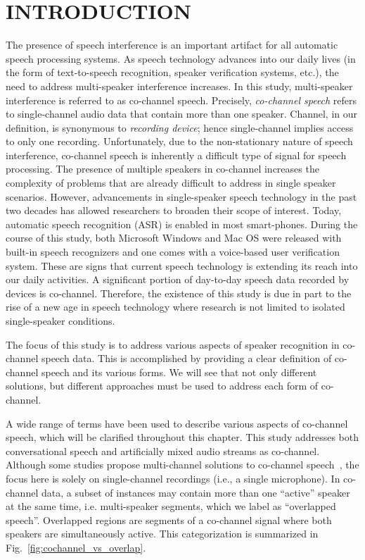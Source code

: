 
\chapter{INTRODUCTION}
 
The presence of speech interference is an important artifact for all automatic speech processing systems. 
As speech technology advances into our daily lives (in the form of text-to-speech recognition, speaker verification systems, etc.), the need to address multi-speaker interference increases. 
In this study, multi-speaker interference is referred to as co-channel speech. 
Precisely, {\it co-channel speech} refers to single-channel audio data that contain more than one speaker. 
Channel, in our definition, is synonymous to {\it recording device}; hence single-channel implies access to only one recording. 
Unfortunately, due to the non-stationary nature of speech interference, co-channel speech is inherently a difficult type of signal for speech processing. 
The presence of multiple speakers in co-channel increases the complexity of problems that are already difficult to address in single speaker scenarios. 
However, advancements in single-speaker speech technology in the past two decades has allowed researchers to broaden their scope of interest. 
Today, automatic speech recognition (ASR) is enabled in most smart-phones. 
During the course of this study, both Microsoft Windows and Mac OS were released with built-in speech recognizers and one comes with a voice-based user verification system. 
These are signs that current speech technology is extending its reach into our daily activities. 
A significant portion of day-to-day speech data recorded by devices is co-channel. 
Therefore, the existence of this study is due in part to the rise of a new age in speech technology where research is not limited to isolated single-speaker conditions. 

The focus of this study is to address various aspects of speaker recognition in co-channel speech data. 
This is accomplished by providing a clear definition of co-channel speech and its various forms. 
We will see that not only different solutions, but different approaches must be used to address each form of co-channel. 





A wide range of terms have been used to describe various aspects of co-channel speech, 
which will be clarified throughout this chapter. 
This study addresses both conversational speech and artificially mixed audio streams as co-channel. 
Although some studies propose multi-channel solutions to co-channel speech~\cite{panahi2009blind,xiao2011overlapped}, the focus here is solely on single-channel recordings (i.e., a single microphone). 
In co-channel data, a subset of instances may contain more than one ``active'' speaker at the same time, i.e. multi-speaker segments, 
which we label as ``overlapped speech''. 
Overlapped regions are segments of a co-channel signal where both speakers are simultaneously active. This categorization is summarized in Fig.~\ref{fig:cochannel_vs_overlap}.


